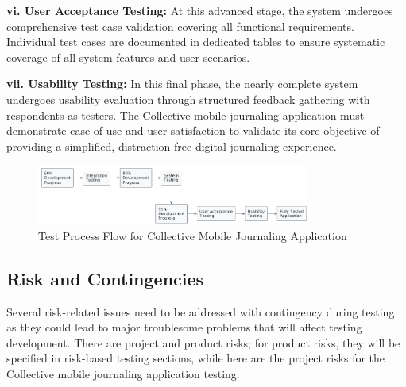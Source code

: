 \textbf{vi. User Acceptance Testing:} At this advanced stage, the system undergoes comprehensive test case validation covering all functional requirements. Individual test cases are documented in dedicated tables to ensure systematic coverage of all system features and user scenarios.

\textbf{vii. Usability Testing:} In this final phase, the nearly complete system undergoes usability evaluation through structured feedback gathering with respondents as testers. The Collective mobile journaling application must demonstrate ease of use and user satisfaction to validate its core objective of providing a simplified, distraction-free digital journaling experience.

\begin{figure}[H]
\centering
\includegraphics[width=0.8\textwidth]{files/imgs/test_process_flow.png}
\caption{Test Process Flow for Collective Mobile Journaling Application}
\label{fig:test-process}
\end{figure}

\subsection{Risk and Contingencies}\label{sec:riskContingencies}

Several risk-related issues need to be addressed with contingency during testing as they could lead to major troublesome problems that will affect testing development. There are project and product risks; for product risks, they will be specified in risk-based testing sections, while here are the project risks for the Collective mobile journaling application testing:

